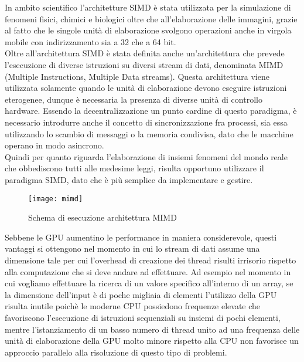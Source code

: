 In ambito scientifico l'architetture SIMD è stata utilizzata per la simulazione
di fenomeni fisici, chimici e biologici oltre che all'elaborazione delle
immagini, grazie al fatto che le singole unità di elaborazione svolgono
operazioni anche in virgola mobile con indirizzamento sia a 32 che a 64 bit.
\\
Oltre all'architettura SIMD è stata definita anche un'architettura che prevede
l'esecuzione di diverse istruzioni su diversi stream di dati, denominata
MIMD (Multiple Instructions, Multiple Data streams)\cite{duncan1990survey}.
Questa architettura viene utilizzata solamente quando le unità di elaborazione
devono eseguire istruzioni eterogenee, dunque è necessaria la presenza
di diverse unità di controllo hardware.
Essendo la decentralizzazione un punto cardine
di questo paradigma, è necessario introdurre anche il concetto di
sincronizzazione fra processi, sia essa utilizzando lo scambio di messaggi o
la memoria condivisa, dato che le macchine operano in modo asincrono.
\\
Quindi per quanto riguarda l'elaborazione di insiemi fenomeni del mondo reale
che obbediscono tutti alle medesime leggi,
risulta opportuno utilizzare il paradigma SIMD, dato che è più semplice da
implementare e gestire.

\begin{figure}[H]
    \centering
    \texttt{[image: mimd]}
    \caption{Schema di esecuzione architettura MIMD\cite{duncan1990survey}}
\end{figure}

Sebbene le GPU aumentino le performance in maniera considerevole, questi
vantaggi si ottengono nel momento in cui lo stream di dati assume
una dimensione tale per cui l'overhead di creazione dei thread risulti
irrisorio rispetto alla computazione che si deve andare ad effettuare.
Ad esempio nel momento in cui vogliamo effettuare la ricerca di un valore
specifico all'interno di un array, se la dimensione dell'input è di poche
migliaia di elementi l'utilizzo della GPU risulta inutile poichè
le moderne CPU possiedono frequenze elevate che favoriscono l'esecuzione
di istruzioni sequenziali su insiemi di pochi elementi, mentre l'istanziamento
di un basso numero di thread unito ad una frequenza delle unità di elaborazione
della GPU molto minore rispetto alla CPU non favorisce un approccio parallelo
alla risoluzione di questo tipo di problemi.
